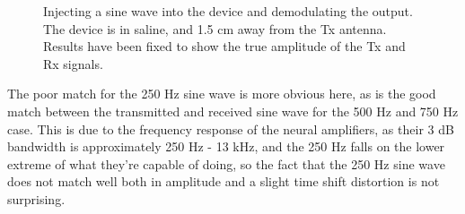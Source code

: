 \documentclass[12pt,onecolumn,titlepage]{article}
\begin{document}
\begin{figure}[htbp]
	\centering
		\quad
		\quad
	\label{fig:sine_demod_fix}
	\caption{Injecting a sine wave into the device and demodulating the output. The device is in saline, and 1.5 cm away from the Tx antenna. Results have been fixed to show the true amplitude of the Tx and Rx signals.}
\end{figure}


The poor match for the 250 Hz sine wave is more obvious here, as is the good match between the transmitted and received sine wave for the 500 Hz and 750 Hz case. This is due to the frequency response of the neural amplifiers, as their 3 dB bandwidth is approximately 250 Hz - 13 kHz, and the 250 Hz falls on the lower extreme of what they're capable of doing, so the fact that the 250 Hz sine wave does not match well both in amplitude and a slight time shift distortion is not surprising. 
\end{document}
